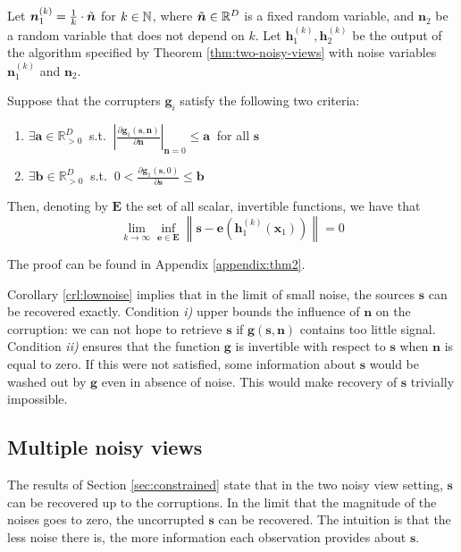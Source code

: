 \medskip

\begin{corollary}
	\label{crl:lownoise}
	Let $\bm{n}_1^{(k)} = \frac{1}{k} \cdot  \Tilde{\bm{n}}$ for $k \in \mathbb{N}$, where $\Tilde{\bm{n}}\in\mathbb{R}^D$ is a fixed random variable, and $\bm{n}_2$ be a random variable that does not depend on $k$.
	Let $\bm{h}_1^{(k)}, \bm{h}_2^{(k)}$ be the output of the algorithm specified by Theorem \ref{thm:two-noisy-views} with noise variables $\bm{n}_1^{(k)}$ and $\bm{n}_2$.
	
	Suppose that the corrupters $\bm{g}_i$ satisfy the following two criteria:
	\begin{enumerate}
		\item $\exists \bm{a}  \in \mathbb{R}_{> 0}^D \: $   s.t. $\: \left|\frac{\partial \bm{g}_1(\bm{s},\bm{n})}{\partial \bm{n}} \right|_{\bm{n}=0} \leq \bm{a} \: $ for all $\bm{s}$
		\item $\exists \bm{b}  \in \mathbb{R}_{> 0}^D \: $ s.t. $\: 0<\frac{\partial \bm{g}_1(\bm{s},0)}{\partial \bm{s}} \leq \bm{b}$
	\end{enumerate}
	Then, denoting by $\bm{E}$ the set of all scalar, invertible functions, we have that
	\[
	\lim_{k \to \infty} \inf_{\bm{e}\in \bm{E}} \left \|\bm{s} - \bm{e}(\bm{h}_1^{(k)}(\bm{x}_1)) \right \| = 0
	\]
\end{corollary}
The proof can be found in Appendix \ref{appendix:thm2}.

Corollary \ref{crl:lownoise} implies that in the limit of small noise, the sources $\bm{s}$ can be recovered exactly.
Condition \textit{i)} upper bounds the influence of $\bm{n}$ on the corruption: we can not hope to retrieve $\bm{s}$ if $\bm{g}(\bm{s}, \bm{n})$ contains too little signal.
Condition \textit{ii)} ensures that the function $\bm{g}$ is invertible with respect to $\bm{s}$ when $\bm{n}$ is equal to zero.
If this were not satisfied, some information about $\bm{s}$ would be washed out by $\bm{g}$ even in absence of noise.
This would make recovery of $\bm{s}$ trivially impossible.


\subsection{Multiple noisy views}
\label{sec:multiple}

The results of Section \ref{sec:constrained} state that in the two noisy view setting, $\bm{s}$ can be recovered up to the corruptions.
In the limit that the magnitude of the noises goes to zero, the uncorrupted $\bm{s}$ can be recovered.
The intuition is that the less noise there is, the more information each observation provides about $\bm{s}$.

